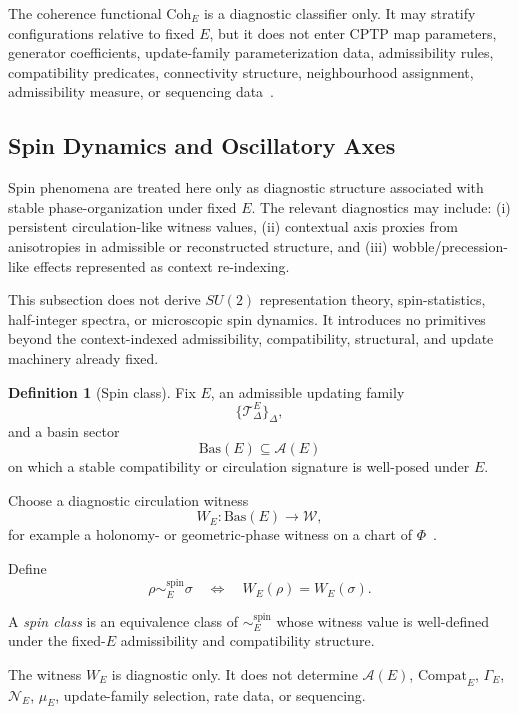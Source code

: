 \documentclass[aps,prx,onecolumn,11pt]{revtex4-2}
\theoremstyle{plain}
\theoremstyle{definition}
\newtheorem{definition}{Definition}
\theoremstyle{remark}
\begin{document}
The coherence functional \(\mathrm{Coh}_E\) is a diagnostic classifier
only. It may stratify configurations relative to fixed \(E\), but it
does not enter CPTP map parameters, generator coefficients,
update-family parameterization data, admissibility rules,
compatibility predicates, connectivity structure, neighbourhood
assignment, admissibility measure, or sequencing
data~\cite{Baumgratz2014,Schlosshauer2007,Gisin1990,
Polchinski1991,Watrous2018}.

\subsection{Spin Dynamics and Oscillatory Axes}
\label{subsec:cd_spin_dynamics_axes}

Spin phenomena are treated here only as diagnostic structure associated
with stable phase-organization under fixed \(E\). The relevant
diagnostics may include: (i) persistent circulation-like witness values,
(ii) contextual axis proxies from anisotropies in admissible or
reconstructed structure, and (iii) wobble/precession-like effects
represented as context re-indexing.

This subsection does not derive \(SU(2)\) representation theory,
spin-statistics, half-integer spectra, or microscopic spin dynamics. It
introduces no primitives beyond the context-indexed admissibility,
compatibility, structural, and update machinery already fixed.

\begin{definition}[Spin class]
\label{def:cd_spin_class}
Fix \(E\), an admissible updating family
\[
\{\mathcal{T}^E_\Delta\}_\Delta,
\]
and a basin sector
\[
\mathrm{Bas}(E)\subseteq\mathcal{A}(E)
\]
on which a stable compatibility or circulation signature is well-posed
under \(E\).

Choose a diagnostic circulation witness
\[
W_E:\mathrm{Bas}(E)\to\mathcal W,
\]
for example a holonomy- or geometric-phase witness on a chart of
\(\Phi\)~\cite{Simon1983,Berry1984,AharonovAnandan1987,Nakahara2003}.

Define
\[
\rho\sim^{\mathrm{spin}}_E\sigma
\quad\Longleftrightarrow\quad
W_E(\rho)=W_E(\sigma).
\]

A \emph{spin class} is an equivalence class of
\(\sim^{\mathrm{spin}}_E\) whose witness value is well-defined under the
fixed-\(E\) admissibility and compatibility structure.
\end{definition}

The witness \(W_E\) is diagnostic only. It does not determine
\(\mathcal A(E)\), \(\mathrm{Compat}_E\), \(\Gamma_E\),
\(\mathcal N_E\), \(\mu_E\), update-family selection, rate data, or
sequencing.
\end{document}
